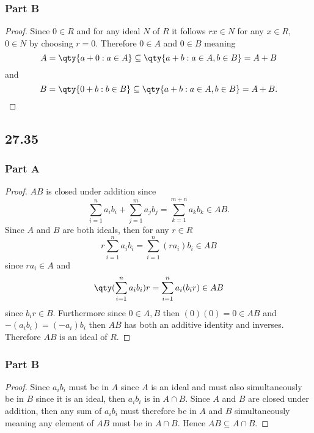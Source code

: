 \documentclass[12pt,titlepage]{extarticle}
\begin{document}
\subsubsection*{Part B}
\begin{proof}
    Since $0 \in R$ and for any ideal $N$ of $R$ it follows $rx \in N$ for any $x \in R$, $0 \in N$ by choosing $r = 0$. Therefore $0 \in A$ and $0 \in B$ meaning
    \[
        A = \qty{a + 0 : a \in A} \subseteq \qty{a + b : a \in A, b \in B} = A + B
    \]
    and
    \[
        B = \qty{0 + b : b \in B} \subseteq \qty{a + b : a \in A, b \in B} = A + B
    .\qedhere\]
\end{proof}

\subsection*{27.35}
\subsubsection*{Part A}
\begin{proof}
    $AB$ is closed under addition since 
    \[
        \sum_{i = 1}^n a_i b_i + \sum_{j = 1}^m a_j b_j = \sum_{k = 1}^{m +n} a_k b_k \in AB
    .\]
    Since $A$ and $B$ are both ideals, then for any $r \in R$
    \[
        r \sum_{i = 1}^n a_i b_i = \sum_{i = 1}^n (r a_i) b_i \in AB
    \]
    since $r a_i \in A$ and
    \[
        \qty(\sum_{i = 1}^n a_i b_i)r = \sum_{i = 1}^n a_i (b_i r) \in AB
    \]
    since $b_i r \in B$. Furthermore since $0 \in A, B$ then $(0) (0) = 0 \in AB$ and $-(a_i b_i) = (-a_i) b_i$ then $AB$ has both an additive identity and inverses. Therefore $AB$ is an ideal of $R$.
\end{proof}

\subsubsection*{Part B}
\begin{proof}
    Since $a_i b_i$ must be in $A$ since $A$ is an ideal and must also simultaneously be in $B$ since it is an ideal, then $a_i b_i$ is in $A \cap B$. Since $A$ and $B$ are closed under addition, then any sum of $a_i b_i$ must therefore be in $A$ and $B$ simultaneously meaning any element of $AB$ must be in $A \cap B$. Hence $AB \subseteq A\cap B$.
\end{proof}
\end{document}
